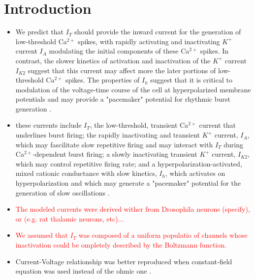 \documentclass[./workflow.tex]{subfiles}
\begin{document}
    \section{Introduction}

    \begin{itemize}
        \item We predict that $I_T$ should provide the inward current for the generation of low-threshold
        Ca$^{2+}$ spikes, with rapidly activating and inactivating $K^+$ current $I_A$ modulating the
        initial components of these Ca$^{2+}$ spikes. In contrast, the slower kinetics of activation
        and inactivation of the $K^+$ current $I_{K2}$ suggest that this current may affect more the
        later portions of low-threshold Ca$^{2+}$ spikes. The properties of $I_h$ suggest that it is 
        critical to modulation of the voltage-time course of the cell at hyperpolarized membrane potentials and
        may provide a "pacemaker" potential for rhythmic burst generation
        \parencite{huguenardSimulationCurrentsInvolved1992}.

        \item these currents include $I_T$, the low-threshold, transient Ca$^{2+}$ current that underlines
        burst firing; the rapidly inactivating and transient $K^{+}$ current, $I_A$, which may fascilitate
        slow repetitive firing and may interact with $I_T$ during Ca$^{2+}$-dependent burst firing;
        a slowly inactivating transient $K^+$ current, $I_{K2}$, which may control repetitive firing rate;
        and a hyperpolarization-activated, mixed cationic conductance with slow kinetics, $I_h$, which activates
        on hyperpolarization and which may generate a "pacemaker" potential for the generation of slow
        oscillations \parencite{huguenardSimulationCurrentsInvolved1992}.

        \item \textcolor{red}{The modeled currents were derived wither from Drosophila neurons (specify),
        or (e.g. rat thalamic neurons, etc)...}

        \item \textcolor{red}{We assumed that $I_T$ was composed of a uniform populatio of channels
        whose inactivation could be ompletely described by the Boltzmann function.}

        \item Current-Voltage relationship was better reproduced when constant-field equation was
        used instead of the ohmic one \parencite{huguenardSimulationCurrentsInvolved1992}.


\end{itemize}
\end{document}
